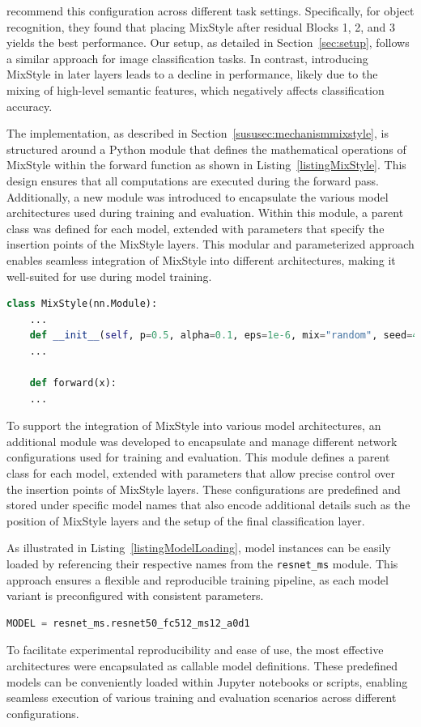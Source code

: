\cite{zhouMixStyleNeuralNetworks2023} recommend this configuration across different task settings. Specifically, for object recognition, they found that placing MixStyle after residual Blocks 1, 2, and 3 yields the best performance. Our setup, as detailed in Section~\ref{sec:setup}, follows a similar approach for image classification tasks. In contrast, introducing MixStyle in later layers leads to a decline in performance, likely due to the mixing of high-level semantic features, which negatively affects classification accuracy.

The implementation, as described in Section~\ref{sususec:mechanismmixstyle}, is structured around a Python module that defines the mathematical operations of MixStyle within the forward function as shown in Listing~\ref{listingMixStyle}. This design ensures that all computations are executed during the forward pass. Additionally, a new module was introduced to encapsulate the various model architectures used during training and evaluation. Within this module, a parent class was defined for each model, extended with parameters that specify the insertion points of the MixStyle layers. This modular and parameterized approach enables seamless integration of MixStyle into different architectures, making it well-suited for use during model training.
\clearpage
\begin{lstlisting}[language=Python, caption={MixStyle implementation structure}, label=listingMixStyle]
class MixStyle(nn.Module):
	...
	def __init__(self, p=0.5, alpha=0.1, eps=1e-6, mix="random", seed=42):
	...
	
	def forward(x):
	...
\end{lstlisting}

To support the integration of MixStyle into various model architectures, an additional module was developed to encapsulate and manage different network configurations used for training and evaluation. This module defines a parent class for each model, extended with parameters that allow precise control over the insertion points of MixStyle layers. These configurations are predefined and stored under specific model names that also encode additional details such as the position of MixStyle layers and the setup of the final classification layer.

As illustrated in Listing~\ref{listingModelLoading}, model instances can be easily loaded by referencing their respective names from the \texttt{resnet\_ms} module. This approach ensures a flexible and reproducible training pipeline, as each model variant is preconfigured with consistent parameters.

\begin{lstlisting}[language=Python, caption={Model loading from predefined configurations}, label=listingModelLoading]
	MODEL = resnet_ms.resnet50_fc512_ms12_a0d1
\end{lstlisting}

To facilitate experimental reproducibility and ease of use, the most effective architectures were encapsulated as callable model definitions. These predefined models can be conveniently loaded within Jupyter notebooks or scripts, enabling seamless execution of various training and evaluation scenarios across different configurations. 
